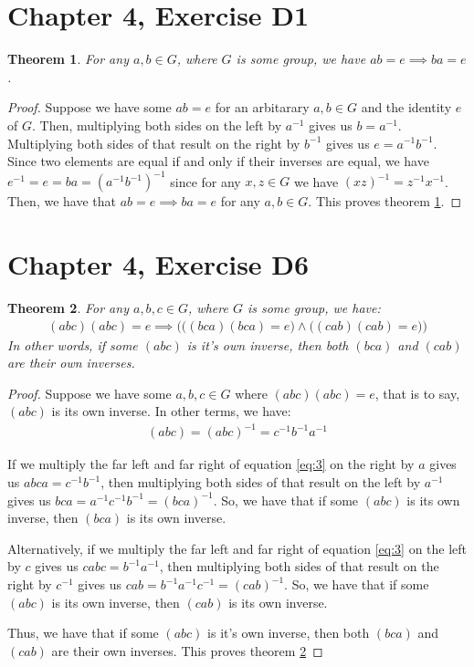 \documentclass[12pt]{article}
\newtheorem{thm}{Theorem}
\begin{document}
\section{Chapter 4, Exercise D1}

\begin{thm} \label{thm:5}
	For any $a,b \in G$,
	where $G$ is some group,
	we have $ab = e \implies ba = e$.
\end{thm}

\begin{proof}
	Suppose we have some $ab = e$
	for an arbitarary $a,b \in G$
	and the identity $e$ of $G$.
	Then, multiplying both sides on the left by $a^{-1}$
	gives us $b = a^{-1}$.
	Multiplying both sides of that result on the right by $b^{-1}$
	gives us $e = a^{-1} b^{-1}$.
	Since two elements are equal if and only if their inverses are equal,
	we have $e^{-1} = e = ba = (a^{-1} b^{-1})^{-1}$
	since for any $x,z \in G$ we have $(xz)^{-1} = z^{-1} x^{-1}$.
	Then, we have that $ab = e \implies ba = e$ for any $a,b \in G$.
	This proves theorem \ref{thm:5}.
\end{proof}

\section{Chapter 4, Exercise D6}

\begin{thm} \label{thm:6}
	For any $a, b, c \in G$,
	where $G$ is some group,
	we have:
	\begin{align}
		(abc)(abc) = e \implies \Big( \big( (bca)(bca) = e \big) \land \big( (cab)(cab) = e \big) \Big)
	\end{align}
	In other words, if some $(abc)$ is it's own inverse,
	then both $(bca)$ and $(cab)$ are their own inverses.
\end{thm}

\begin{proof}
	Suppose we have some $a,b,c \in G$ where $(abc)(abc) = e$,
	that is to say, $(abc)$ is its own inverse.
	In other terms, we have:
	\begin{align} \label{eq:3}
		(abc) = (abc)^{-1} = c^{-1} b^{-1} a^{-1}
	\end{align}

	If we multiply the far left and far right
	of equation \ref{eq:3}
	on the right by $a$
	gives us $abca = c^{-1} b^{-1}$,
	then multiplying both sides of that result
	on the left by $a^{-1}$
	gives us $bca = a^{-1} c^{-1} b^{-1} = (bca)^{-1}$.
	So, we have that
	if some $(abc)$ is its own inverse,
	then $(bca)$ is its own inverse.


	Alternatively, if we multiply
	the far left and far right of equation \ref{eq:3}
	on the left by $c$
	gives us $cabc = b^{-1} a^{-1}$,
	then multiplying both sides of that result
	on the right by $c^{-1}$
	gives us $cab = b^{-1} a^{-1} c^{-1} = (cab)^{-1}$.
	So, we have that
	if some $(abc)$ is its own inverse,
	then $(cab)$ is its own inverse.

	Thus, we have that if some $(abc)$ is it's own inverse,
	then both $(bca)$ and $(cab)$ are their own inverses.
	This proves theorem \ref{thm:6}
\end{proof}
\end{document}
